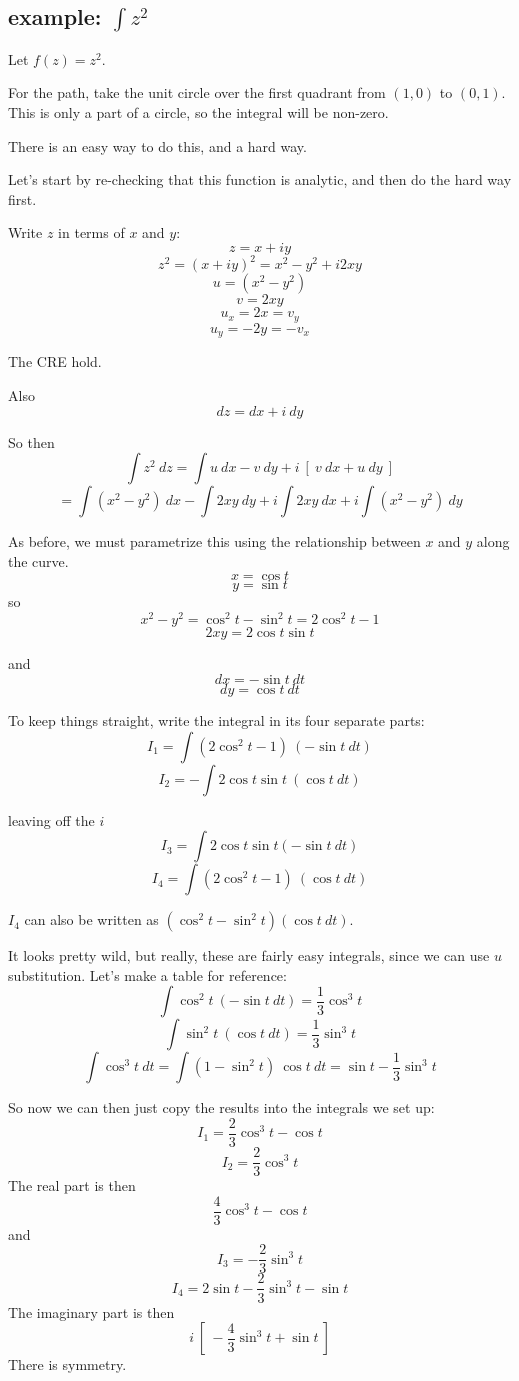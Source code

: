 \documentclass[11pt, oneside]{article}
\begin{document}
\subsection*{example:  $\int z^2$}
Let $f(z) = z^2$.  

For the path, take the unit circle over the first quadrant from $(1,0)$ to $(0,1)$.  This is only a part of a circle, so the integral will be non-zero. 

There is an easy way to do this, and a hard way.  

Let's start by re-checking that this function is analytic, and then do the hard way first.

Write $z$ in terms of $x$ and $y$:
\[ z = x + iy \]
\[ z^2 = (x + iy)^2 = x^2 - y^2 + i2xy \]
\[ u = (x^2 - y^2) \]
\[ v = 2xy \]
\[ u_x = 2x = v_y \]
\[ u_y = -2y = -v_x \]

The CRE hold.

Also
\[ dz = dx + i \ dy \]

So then
\[ \int z^2 \ dz = \int u \ dx - v \ dy + i \ [ \ v \ dx + u \ dy \ ] \]
\[ = \int (x^2 - y^2) \ dx - \int 2 xy \ dy + i \int 2xy \ dx + i \int (x^2-y^2) \ dy \]

As before, we must parametrize this using the relationship between $x$ and $y$ along the curve.
\[ x = \cos t \]
\[ y = \sin t \]
so
\[ x^2 - y^2 = \cos^2 t - \sin^2 t = 2 \cos^2 t - 1  \]
\[ 2xy = 2 \cos t \sin t  \]

and
\[ dx = - \sin t \ dt \]
\[ dy = \cos t \ dt \]

To keep things straight, write the integral in its four separate parts:
\[ I_1 = \int (2 \cos^2 t - 1) \  (- \sin t \ dt) \]
\[ I_2 = - \int 2 \cos t \sin t \ (\cos t \ dt) \]

leaving off the $i$
\[ I_3 = \int 2 \cos t \sin t (- \sin t \ dt) \]
\[ I_4 = \int (2 \cos^2 t - 1) \ (\cos t \ dt) \]

$I_4$ can also be written as $(\cos^2 t - \sin^2 t)(\cos t \ dt)$.

It looks pretty wild, but really, these are fairly easy integrals, since we can use $u$ substitution.  Let's make a table for reference:
\[ \int \cos^2 t \ (- \sin t \ dt) = \frac{1}{3} \cos^3 t \]
\[ \int \sin^2 t \ (\cos t \ dt) = \frac{1}{3} \sin^3 t \]
\[ \int \cos^3 t \ dt = \int (1 - \sin^2 t) \ \cos t \ dt = \sin t - \frac{1}{3} \sin^3 t \]

So now we can then just copy the results into the integrals we set up:
\[ I_1 = \frac{2}{3} \cos^3 t - \cos t \]
\[  I_2 = \frac{2}{3} \cos^3 t \]
The real part is then
\[  \frac{4}{3} \cos^3 t - \cos t \]
and
\[ I_3 = -\frac{2}{3} \sin^3 t \]
\[  I_4  = 2 \sin t - \frac{2}{3} \sin^3 t - \sin t \]
The imaginary part is then
\[ i \ [ \ -\frac{4}{3} \sin^3 t + \sin t \ ] \]
There is symmetry.
\end{document}
